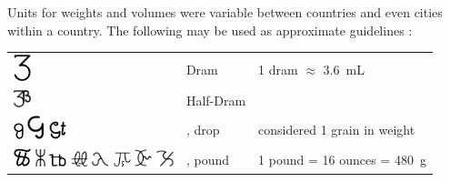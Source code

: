 \documentclass[british,final,landscape]{scrartcl}
\begin{document}
\begin{refsection}
Units for weights and volumes were variable between countries and even cities within a country. The following may be used as approximate guidelines \parencite{Pri-98}:

 \tablelasttail{\bottomrule}
 \begin{supertabular}{p{0.3\textwidth}p{0.34\textwidth}p{0.34\textwidth}}
   \includegraphics[width=5mm]{Measures/Dram} & Dram & 1 dram \(\approx\) \SI{3.6}{mL} \\
   \includegraphics[width=5mm]{Measures/HalfDram} & Half-Dram &  \\
   \includegraphics[height=5mm]{Measures/Drop} \includegraphics[width=5mm]{Measures/Drop2} \includegraphics[width=5mm]{Measures/Drop3} & , drop  & considered 1 grain in weight \\
   \includegraphics[width=5mm]{Measures/Pound}  \includegraphics[height=5mm]{Measures/Pound2} \includegraphics[width=5mm]{Measures/Pound3} \includegraphics[width=5mm]{Measures/Pound4} \includegraphics[width=5mm]{Measures/Pound5} \includegraphics[width=5mm]{Measures/Pound6} \includegraphics[width=5mm]{Measures/Pound7} \includegraphics[width=5mm]{Measures/Pound8} & , pound & 1 pound = 16 ounces = \SI{480}{g} \\

\end{supertabular}
\end{refsection}
\end{document}
